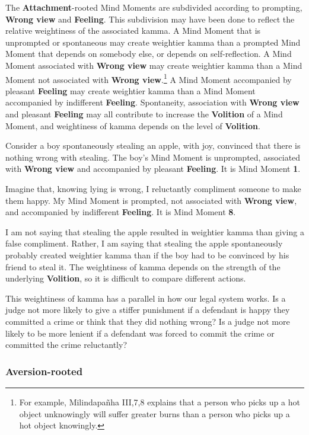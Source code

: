 The \textbf{Attachment}-rooted Mind Moments are subdivided according to prompting, \textbf{Wrong view} and \textbf{Feeling}. This subdivision may have been done to reflect the relative weightiness of the associated kamma. A Mind Moment that is unprompted or spontaneous may create weightier kamma than a prompted Mind Moment that depends on somebody else, or depends on self-reflection. A Mind Moment associated with \textbf{Wrong view} may create weightier kamma than a Mind Moment not associated with \textbf{Wrong view}.\footnote{For example, Milindapañha III,7,8 explains that a person who picks up a hot object unknowingly will suffer greater burns than a person who picks up a hot object knowingly.} A Mind Moment accompanied by pleasant \textbf{Feeling} may create weightier kamma than a Mind Moment accompanied by indifferent \textbf{Feeling}. Spontaneity, association with \textbf{Wrong view} and pleasant \textbf{Feeling} may all contribute to increase the \textbf{Volition} of a Mind Moment, and weightiness of kamma depends on the level of \textbf{Volition}.

Consider a boy spontaneously stealing an apple, with joy, convinced that there is nothing wrong with stealing. The boy’s Mind Moment is unprompted, associated with \textbf{Wrong view} and accompanied by pleasant \textbf{Feeling}. It is Mind Moment \textbf{1}.

Imagine that, knowing lying is wrong, I reluctantly compliment someone to make them happy. My Mind Moment is prompted, not associated with \textbf{Wrong view}, and accompanied by indifferent \textbf{Feeling}. It is Mind Moment \textbf{8}.

I am not saying that stealing the apple resulted in weightier kamma than giving a false compliment. Rather, I am saying that stealing the apple spontaneously probably created weightier kamma than if the boy had to be convinced by his friend to steal it. The weightiness of kamma depends on the strength of the underlying \textbf{Volition}, so it is difficult to compare different actions.

This weightiness of kamma has a parallel in how our legal system works. Is a judge not more likely to give a stiffer punishment if a defendant is happy they committed a crime or think that they did nothing wrong? Is a judge not more likely to be more lenient if a defendant was forced to commit the crime or committed the crime reluctantly?

\subsubsection*{\textbf{Aversion}-rooted}

